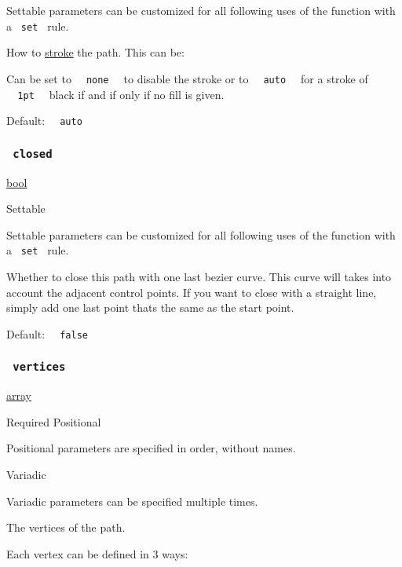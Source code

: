 \label{parameters-stroke-settable-tooltip}
Settable parameters can be customized for all following uses of the
function with a \texttt{\ set\ } rule.

How to \href{/docs/reference/visualize/stroke/}{stroke} the path. This
can be:

Can be set to \texttt{\ }{\texttt{\ none\ }}\texttt{\ } to disable the
stroke or to \texttt{\ }{\texttt{\ auto\ }}\texttt{\ } for a stroke of
\texttt{\ }{\texttt{\ 1pt\ }}\texttt{\ } black if and if only if no fill
is given.

Default: \texttt{\ }{\texttt{\ auto\ }}\texttt{\ }

\subsubsection{\texorpdfstring{\texttt{\ closed\ }}{ closed }}\label{parameters-closed}

\href{/docs/reference/foundations/bool/}{bool}

{{ Settable }}

\label{parameters-closed-settable-tooltip}
Settable parameters can be customized for all following uses of the
function with a \texttt{\ set\ } rule.

Whether to close this path with one last bezier curve. This curve will
takes into account the adjacent control points. If you want to close
with a straight line, simply add one last point that\textquotesingle s
the same as the start point.

Default: \texttt{\ }{\texttt{\ false\ }}\texttt{\ }

\subsubsection{\texorpdfstring{\texttt{\ vertices\ }}{ vertices }}\label{parameters-vertices}

\href{/docs/reference/foundations/array/}{array}

{Required} {{ Positional }}

\label{parameters-vertices-positional-tooltip}
Positional parameters are specified in order, without names.

{{ Variadic }}

\label{parameters-vertices-variadic-tooltip}
Variadic parameters can be specified multiple times.

The vertices of the path.

Each vertex can be defined in 3 ways:

